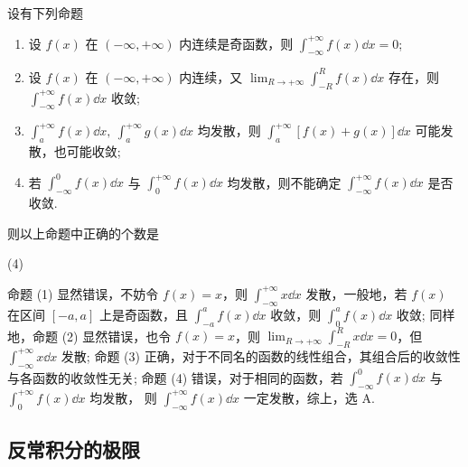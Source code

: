 \begin{example}
    设有下列命题
    \begin{enumerate}[label=(\arabic{*})]
        \item 设 $ f(x) $ 在 $ (-\infty,+\infty) $ 内连续是奇函数，则 $\displaystyle  \int_{-\infty}^{+\infty} f(x) \dd x=0 $;
        \item 设 $ f(x) $ 在 $ (-\infty,+\infty) $ 内连续，又 $\displaystyle \lim _{R \rightarrow+\infty} \int_{-R}^{R} f(x) \dd x $ 存在，则 $\displaystyle \int_{-\infty}^{+\infty} f(x) \dd x $ 收敛;
        \item $\displaystyle \int_{a}^{+\infty} f(x) \dd x,~ \int_{a}^{+\infty} g(x) \dd x $ 均发散，则 $\displaystyle  \int_{a}^{+\infty}[f(x)+g(x)] \dd x $ 可能发散，也可能收敛;
        \item 若 $ \displaystyle \int_{-\infty}^{0} f(x) \dd x $ 与 $\displaystyle  \int_{0}^{+\infty} f(x) \dd x $ 均发散，则不能确定 $\displaystyle \int_{-\infty}^{+\infty} f(x) \dd x $ 是否收敛.
    \end{enumerate}
    则以上命题中正确的个数是
    \begin{tasks}(4)
    \end{tasks}
\end{example}
\begin{solution}
    命题 (1) 显然错误，不妨令 $f(x)=x$，则 $\displaystyle\int_{-\infty}^{+\infty}x\dd x$ 发散，一般地，若 $f(x)$ 在区间 $[-a,a]$ 上是奇函数，且 $\displaystyle\int_{-a}^{a}f(x)\dd x$ 收敛，则 $\displaystyle\int_{0}^{a}f(x)\dd x$ 收敛;
    同样地，命题 (2) 显然错误，也令 $f(x)=x$，则 $\displaystyle\lim_{R\to+\infty}\int_{-R}^{R}x\dd x=0$，但 $\displaystyle\int_{-\infty}^{+\infty}x\dd x$ 发散;
    命题 (3) 正确，对于不同名的函数的线性组合，其组合后的收敛性与各函数的收敛性无关; 命题 (4) 错误，对于相同的函数，若 $ \displaystyle \int_{-\infty}^{0} f(x) \dd x $ 与 $\displaystyle  \int_{0}^{+\infty} f(x) \dd x $ 均发散，
    则 $\displaystyle \int_{-\infty}^{+\infty} f(x) \dd x $ 一定发散，综上，选 A.
\end{solution}

\subsection{反常积分的极限}

